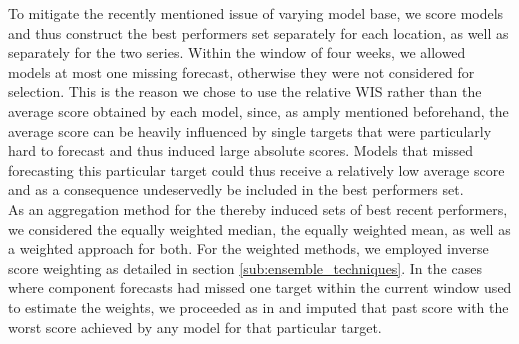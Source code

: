 To mitigate the recently mentioned issue of varying model base, we score models and thus construct the best performers set separately for each location, as well as separately for the two series. Within the window of four weeks, we allowed models at most one missing forecast, otherwise they were not considered for selection. This is the reason we chose to use the relative WIS rather than the average score obtained by each model, since, as amply mentioned beforehand, the average score can be heavily influenced by single targets that were particularly hard to forecast and thus induced large absolute scores. Models that missed forecasting this particular target could thus receive a relatively low average score and as a consequence undeservedly be included in the best performers set.\\
As an aggregation method for the thereby induced sets of best recent performers, we considered the equally weighted median, the equally weighted mean, as well as a weighted approach for both. For the weighted methods, we employed inverse score weighting as detailed in section \ref{sub:ensemble_techniques}. In the cases where component forecasts had missed one target within the current window used to estimate the weights, we proceeded as in \cite{bracher_pre-registered_2021} and imputed that past score with the worst score achieved by any model for that particular target.%
